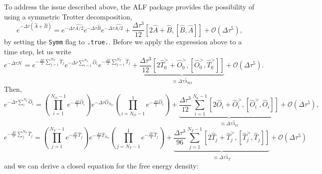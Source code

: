 To address the issue described above, the ALF package provides the possibility of using a symmetric Trotter decomposition,
\begin{equation}
	e^{ -\Delta \tau \left( \hat{A} + \hat{B} \right)  }  =  e^{ -\Delta \tau \hat{A/2}}  e^{ -\Delta \tau  \hat{B}  }   e^{ -\Delta \tau \hat{A/2}}  +  \frac{\Delta  \tau^3}{12} \left[ 2\hat{A} + \hat{B}, \left[\hat{B}, \hat{A} \right]\right] + \mathcal{O} \left (\Delta \tau ^5 \right),
\end{equation}
by setting the \texttt{Symm}  flag to \texttt{.true.}.
Before we apply the expression above to a time step, let us write
\begin{equation}
	e^{-\Delta \tau \mathcal{H}}    =       e^{-\frac{\Delta \tau}{2} \sum_{j=1}^{N_T} \hat{T}_j } e^{-\Delta \tau \sum_{i=1}^{N_I} \hat{O}_i } e^{-\frac{\Delta \tau}{2} \sum_{j=1}^{N_T} \hat{T}_j }   
	 +  \underbrace{\frac{\Delta \tau ^3}{12}   \left[ 2\hat{T}^{>}_0 + \hat{O}^{>}_0, \left[\hat{O}^{>}_{0}, \hat{T}^{>}_0 \right]\right] }_{\equiv \Delta \tau \hat{\lambda}_{TO}}   + \mathcal{O}\left(  \Delta \tau^5 \right).
\end{equation}
Then,
\begin{equation}
 e^{-\Delta \tau \sum_{i}^{N_I} \hat{O}_i }  =  \left(\prod_{i=1}^{N_O-1} e^{-\frac{\Delta \tau}{2} \hat{O}_i } \right)    e^{-\Delta \tau \hat{O}_{N_O} }    
   \left(  \prod_{i=N_O-1}^{1} e^{-\frac{\Delta \tau}{2} \hat{O}_i } \right)   + 
  \underbrace{\frac{\Delta \tau ^3}{12}  \sum_{i=1}^{N_0-1} \left[ 2\hat{O}_i + \hat{O}^{>}_i, \left[\hat{O}^{>}_{i}, \hat{O}_i \right]\right] }_{\equiv \Delta \tau \hat{\lambda}_{O}}    + \mathcal{O}\left(  \Delta  \tau^5 \right), 
\end{equation}
\begin{equation}
 e^{- \frac{\Delta \tau}{2} \sum_{j}^{N_T} \hat{T}_j }  =  \left(\prod_{j=1}^{N_T-1} e^{-\frac{\Delta \tau}{4} \hat{T}_j } \right)    e^{-\frac{\Delta \tau}{2} \hat{T}_{N_T} }    
   \left(  \prod_{j=N_T-1}^{1} e^{-\frac{\Delta \tau}{4} \hat{T}_j } \right)   + 
  \underbrace{\frac{\Delta \tau ^3}{96}  \sum_{j=1}^{N_T-1} \left[ 2\hat{T}_j + \hat{T}^{>}_j, \left[\hat{T}^{>}_{j}, \hat{T}_j \right]\right] }_{\equiv \Delta \tau \hat{\lambda}_{T}}    + \mathcal{O}\left(  \Delta  \tau^5 \right) 
\end{equation}
and we can derive  a  closed equation  for  the free energy density:
